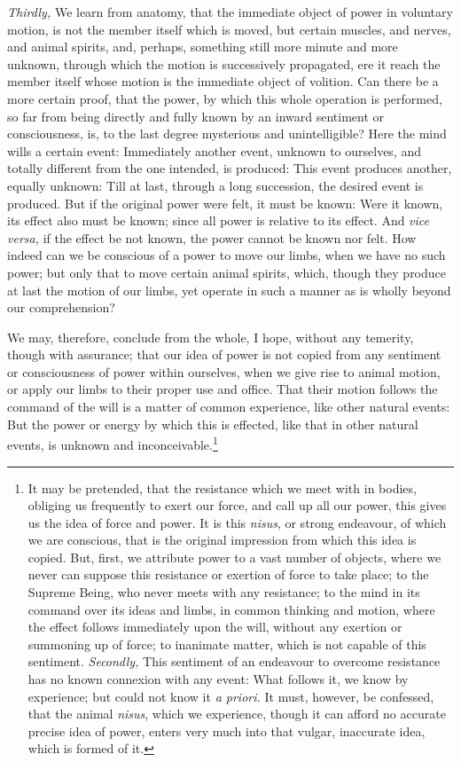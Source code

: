 \documentclass[]{article}
\newcounter{authornote}[page]
\newcommand*{\authornote}[1]{\renewcommand{\thefootnote}{\fnsymbol{footnote}}\stepcounter{authornote}\footnote[\value{authornote}]{#1}\renewcommand{\thefootnote}{\arabic{footnote}}}
\begin{document}
\begin{sectionbody}
\humeparagraph  \emph{Thirdly,} We learn from anatomy, that the immediate object of power in voluntary motion, is not the member itself which is moved, but certain muscles, and nerves, and animal spirits, and, perhaps, something still more minute and more unknown, through which the motion is successively propagated, ere it reach the member itself whose motion is the immediate object of volition. Can there be a more certain proof, that the power, by which this whole operation is performed, so far from being directly and fully known by an inward sentiment or consciousness, is, to the last degree mysterious and unintelligible? Here the mind wills a certain event: Immediately another event, unknown to ourselves, and totally different from the one intended, is produced: This event produces another, equally unknown: Till at last, through a long succession, the desired event is produced. But if the original power were felt, it must be known: Were it known, its effect also must be known; since all power is relative to its effect. And \emph{vice versa,} if the effect be not known, the power cannot be known nor felt. How indeed can we be conscious of a power to move our limbs, when we have no such power; but only that to move certain animal spirits, which, though they produce at last the motion of our limbs, yet operate in such a manner as is wholly beyond our comprehension?

\humeparagraph  We may, therefore, conclude from the whole, I hope, without any temerity, though with assurance; that our idea of power is not copied from any sentiment or consciousness of power within ourselves, when we give rise to animal motion, or apply our limbs to their proper use and office. That their motion follows the command of the will is a matter of common experience, like other natural events: But the power or energy by which this is effected, like that in other natural events, is unknown and inconceivable.\authornote{It may be pretended, that the resistance which we meet with in bodies, obliging us frequently to exert our force, and call up all our power, this gives us the idea of force and power. It is this \emph{nisus}, or strong endeavour, of which we are conscious, that is the original impression from which this idea is copied. But, first, we attribute power to a vast number of objects, where we never can suppose this resistance or exertion of force to take place; to the Supreme Being, who never meets with any resistance; to the mind in its command over its ideas and limbs, in common thinking and motion, where the effect follows immediately upon the will, without any exertion or summoning up of force; to inanimate matter, which is not capable of this sentiment. \emph{Secondly,} This sentiment of an endeavour to overcome resistance has no known connexion with any event: What follows it, we know by experience; but could not know it \emph{a priori.} It must, however, be confessed, that the animal \emph{nisus}, which we experience, though it can afford no accurate precise idea of power, enters very much into that vulgar, inaccurate idea, which is formed of it.}


\end{sectionbody}
\end{document}
